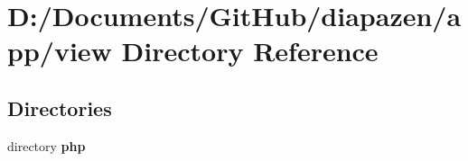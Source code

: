 \section{D\-:/\-Documents/\-Git\-Hub/diapazen/app/view Directory Reference}
\label{dir_7fd6932ce7f04b9c7eb72b92d75242f0}
\subsection*{Directories}
\begin{DoxyCompactItemize}
\item 
directory {\bf php}
\end{DoxyCompactItemize}
